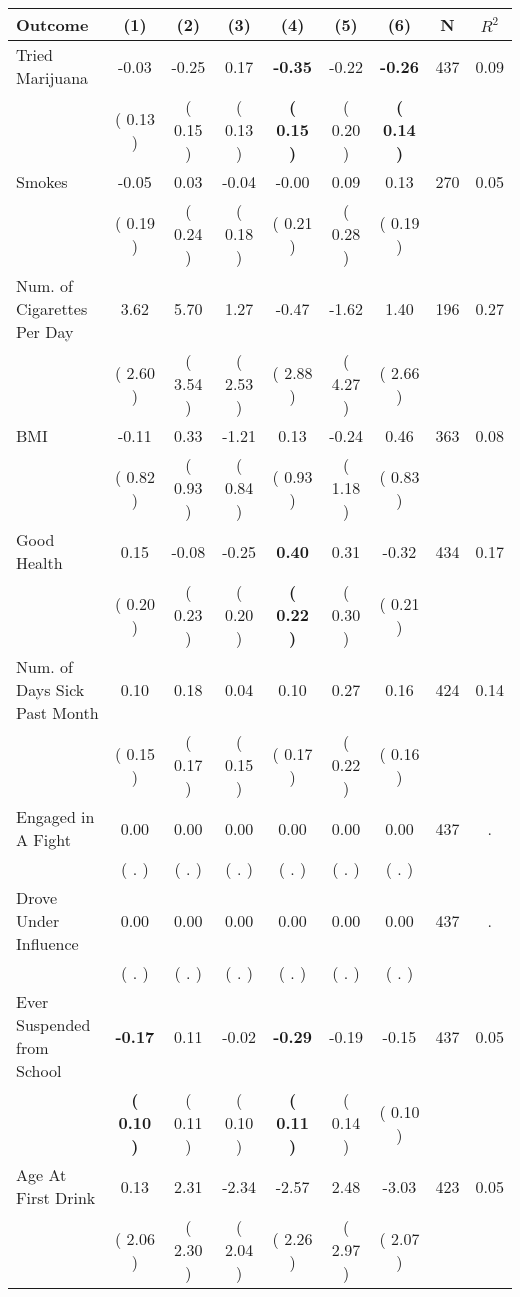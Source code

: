 \begin{tabular}{lcccccccc}
\toprule
 \textbf{Outcome} & \textbf{(1)} & \textbf{(2)} & \textbf{(3)} & \textbf{(4)} & \textbf{(5)} & \textbf{(6)} & \textbf{N} & \textbf{$ R^2$} \\
\midrule
Tried Marijuana &     -0.03 &     -0.25 &      0.17 & \textbf{    -0.35} &     -0.22 & \textbf{    -0.26} & 437 &       0.09 \\ 
 & (     0.13 ) & (     0.15 ) & (     0.13 ) & \textbf{(     0.15 )} & (     0.20 ) & \textbf{(     0.14 )} & \\
Smokes &     -0.05 &      0.03 &     -0.04 &     -0.00 &      0.09 &      0.13 & 270 &       0.05 \\ 
 & (     0.19 ) & (     0.24 ) & (     0.18 ) & (     0.21 ) & (     0.28 ) & (     0.19 ) & \\
Num. of Cigarettes Per Day &      3.62 &      5.70 &      1.27 &     -0.47 &     -1.62 &      1.40 & 196 &       0.27 \\ 
 & (     2.60 ) & (     3.54 ) & (     2.53 ) & (     2.88 ) & (     4.27 ) & (     2.66 ) & \\
BMI &     -0.11 &      0.33 &     -1.21 &      0.13 &     -0.24 &      0.46 & 363 &       0.08 \\ 
 & (     0.82 ) & (     0.93 ) & (     0.84 ) & (     0.93 ) & (     1.18 ) & (     0.83 ) & \\
Good Health &      0.15 &     -0.08 &     -0.25 & \textbf{     0.40} &      0.31 &     -0.32 & 434 &       0.17 \\ 
 & (     0.20 ) & (     0.23 ) & (     0.20 ) & \textbf{(     0.22 )} & (     0.30 ) & (     0.21 ) & \\
Num. of Days Sick Past Month &      0.10 &      0.18 &      0.04 &      0.10 &      0.27 &      0.16 & 424 &       0.14 \\ 
 & (     0.15 ) & (     0.17 ) & (     0.15 ) & (     0.17 ) & (     0.22 ) & (     0.16 ) & \\
Engaged in A Fight &      0.00 &      0.00 &      0.00 &      0.00 &      0.00 &      0.00 & 437 &          . \\ 
 & (        . ) & (        . ) & (        . ) & (        . ) & (        . ) & (        . ) & \\
Drove Under Influence &      0.00 &      0.00 &      0.00 &      0.00 &      0.00 &      0.00 & 437 &          . \\ 
 & (        . ) & (        . ) & (        . ) & (        . ) & (        . ) & (        . ) & \\
Ever Suspended from School & \textbf{    -0.17} &      0.11 &     -0.02 & \textbf{    -0.29} &     -0.19 &     -0.15 & 437 &       0.05 \\ 
 & \textbf{(     0.10 )} & (     0.11 ) & (     0.10 ) & \textbf{(     0.11 )} & (     0.14 ) & (     0.10 ) & \\
Age At First Drink &      0.13 &      2.31 &     -2.34 &     -2.57 &      2.48 &     -3.03 & 423 &       0.05 \\ 
 & (     2.06 ) & (     2.30 ) & (     2.04 ) & (     2.26 ) & (     2.97 ) & (     2.07 ) & \\
\bottomrule
\end{tabular}
